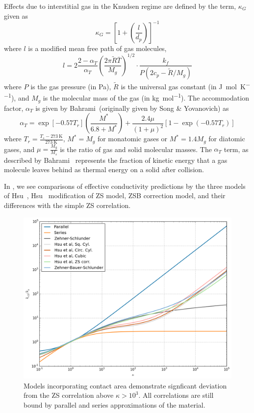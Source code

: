 Effects due to interstitial gas in the Knudsen regime are defined by the term, $\kappa_G$ given as
\begin{equation}
    \kappa_G = \left[1 + \left(\frac{l}{d_p}\right)\right]^{-1}
\end{equation}
where $l$ is a modified mean free path of gas molecules,
\begin{equation}
    l = 2\frac{2-\alpha_T}{\alpha_T}\left(\frac{2\pi\tilde{R}\bar{T}}{M_g}\right)^{1/2}\cdot\frac{k_f}{P(2c_p - \tilde{R}/M_g)}
\end{equation}
where $P$ is the gas pressure (in \si{\pascal}), $\tilde{R}$ is the universal gas constant (in \si{\joule\per\mol\per\kelvin}), and $M_g$ is the molecular mass of the gas (in \si{\kilo\gram\per\mol}). The accommodation factor, $\alpha_T$ is given by Bahrami\etal~(originally given by Song \& Yovanovich) as \cite{Bahrami20063691,song1988relative}
\begin{equation}
    \alpha_T = \exp\left[-0.57T_r\right]\left(\frac{M^*}{6.8+M^*}\right) + \frac{2.4\mu}{(1+\mu)^2}\left[1-\exp\left(-0.57T_r\right)\right]
\end{equation}
where $T_r = \frac{T_s-\SI{273}{\kelvin}}{\SI{273}{\kelvin}}$, $M^* = M_g$ for monatomic gases or $M^* = 1.4M_g$ for diatomic gases, and $\mu = \frac{M_g}{M_s}$ is the ratio of gas and solid molecular masses. The $\alpha_T$ term, as described by Bahrami\etal~ represents the fraction of kinetic energy that a gas molecule leaves behind as thermal energy on a solid after collision.

In , we see comparisons of effective conductivity predictions by the three models of Hsu\etal~, Hsu\etal~ modification of ZS model, ZSB correction model, and their differences with the simple ZS correlation.

\begin{figure}[ht]
    \centering
    \includegraphics[width=\textwidth]{figures/keff-kappa-series-parallel-zs-hsus}
    \caption{Models incorporating contact area demonstrate signficant deviation from the ZS correlation above $\kappa > 10^3$. All correlations are still bound by parallel and series approximations of the material.}
    \label{fig:kappa-series-parallel-zs-hsus}
\end{figure}

